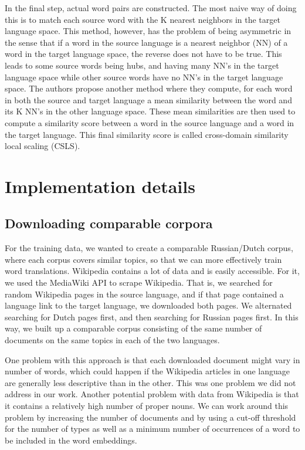 \documentclass{article}
\begin{document}
In the final step, actual word pairs are constructed. The most naive way of doing this is to match each source word with the K nearest neighbors in the target language space. This method, however, has the problem of being asymmetric in the sense that if a word in the source language is a nearest neighbor (NN) of a word in the target language space, the reverse does not have to be true. This leads to some source words being hubs, and having many NN’s in the target language space while other source words have no NN’s in the target language space. The authors propose another method where they compute, for each word in both the source and target language a mean similarity between the word and its K NN’s in the other language space. These mean similarities are then used to compute a similarity score between a word in the source language and a word in the target language. This final similarity score is called cross-domain similarity local scaling (CSLS). 


\section{Implementation details}

\subsection{Downloading comparable corpora}
For the training data, we wanted to create a comparable Russian/Dutch corpus, where each corpus covers similar topics, so that we can more effectively train word translations. Wikipedia contains a lot of data and is easily accessible. For it, we used the MediaWiki API to scrape Wikipedia. That is, we searched for random Wikipedia pages in the source language, and if that page contained a language link to the target language, we downloaded both pages. We alternated searching for Dutch pages first, and then searching for Russian pages first. In this way, we built up a comparable corpus consisting of the same number of documents on the same topics in each of the two languages. 

One problem with this approach is that each downloaded document might vary in number of words, which could happen if the Wikipedia articles in one language are generally less descriptive than in the other. This was one problem we did not address in our work. Another potential problem with data from Wikipedia is that it contains a relatively high number of proper nouns. We can work around this problem by increasing the number of documents and by using a cut-off threshold for the number of types as well as a minimum number of occurrences of a word to be included in the word embeddings. 
\end{document}
